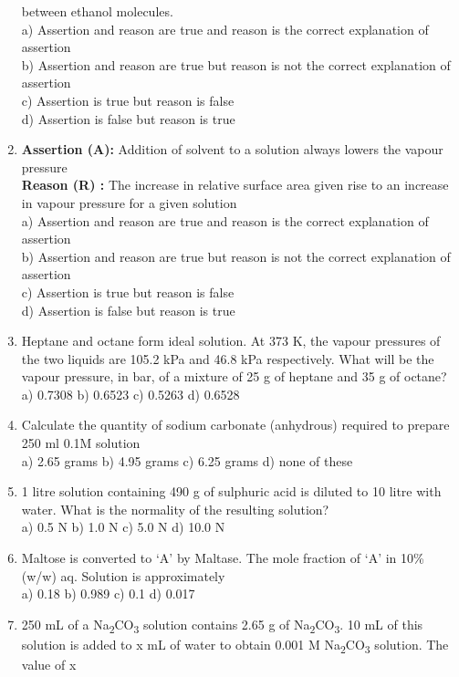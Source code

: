 \begin{enumerate}
  between ethanol molecules.\\
  a) Assertion and reason are true and reason is the correct explanation
  of assertion\\
  b) Assertion and reason are true but reason is not the correct
  explanation of assertion\\
  c) Assertion is true but reason is false\\
  d) Assertion is false but reason is true
\item
  \textbf{Assertion (A):} Addition of solvent to a solution always
  lowers the vapour pressure\\
  \textbf{Reason (R) :} The increase in relative surface area given rise
  to an increase in vapour pressure for a given solution\\
  a) Assertion and reason are true and reason is the correct explanation
  of assertion\\
  b) Assertion and reason are true but reason is not the correct
  explanation of assertion\\
  c) Assertion is true but reason is false\\
  d) Assertion is false but reason is true
\item
  Heptane and octane form ideal solution. At 373 K, the vapour pressures
  of the two liquids are 105.2 kPa and 46.8 kPa respectively. What will
  be the vapour pressure, in bar, of a mixture of 25 g of heptane and 35
  g of octane?\\
  a) 0.7308 b) 0.6523 c) 0.5263 d) 0.6528
\item
  Calculate the quantity of sodium carbonate (anhydrous) required to
  prepare 250 ml 0.1M solution\\
  a) 2.65 grams b) 4.95 grams c) 6.25 grams d) none of these
\item
  1 litre solution containing 490 g of sulphuric acid is diluted to 10
  litre with water. What is the normality of the resulting solution?\\
  a) 0.5 N b) 1.0 N c) 5.0 N d) 10.0 N
\item
  Maltose is converted to `A' by Maltase. The mole fraction of `A' in
  10\% (w/w) aq. Solution is approximately\\
  a) 0.18 b) 0.989 c) 0.1 d) 0.017
\item
  250 mL of a Na\textsubscript{2}CO\textsubscript{3} solution contains
  2.65 g of Na\textsubscript{2}CO\textsubscript{3}. 10 mL of this
  solution is added to x mL of water to obtain 0.001 M
  Na\textsubscript{2}CO\textsubscript{3} solution. The value of x

\end{enumerate}
